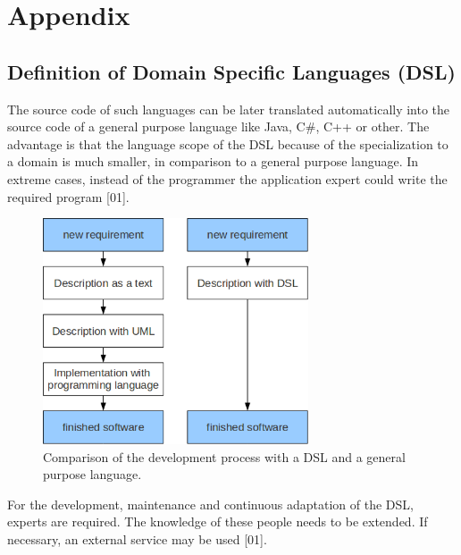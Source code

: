 \chapter{Appendix}
\section{Definition of Domain Specific Languages (DSL)}
\par
\par
The source code of such languages can be later translated automatically into the source code of a general purpose language like Java, C\#, C++ or other. The advantage is that the language scope of the DSL because of the specialization to a domain is much smaller, in comparison to a general purpose language. In extreme cases, instead of the programmer the application expert could write the required program [01]. %
\begin{figure}[h]
	\centering
	\includegraphics[width=0.7\textwidth]{pics/appendix/dsl.png}
	\caption{Comparison of the development process with a DSL and a general purpose language.  \label{fig:dsl}}	
\end{figure}
\par
For the development, maintenance and continuous adaptation of the DSL, experts are required. The knowledge of these people needs to be extended. If necessary, an external service may be used [01].

